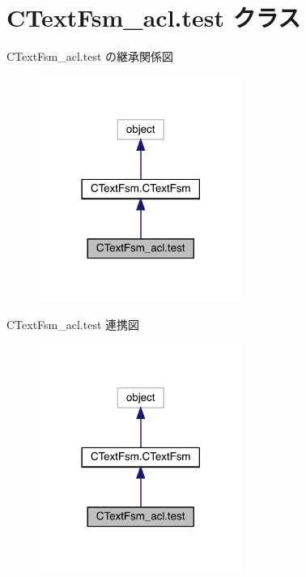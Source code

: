 \hypertarget{classCTextFsm__acl_1_1test}{}\section{C\+Text\+Fsm\+\_\+acl.\+test クラス}
\label{classCTextFsm__acl_1_1test}


C\+Text\+Fsm\+\_\+acl.\+test の継承関係図
\nopagebreak
\begin{figure}[H]
\begin{center}
\leavevmode
\includegraphics[width=189pt]{classCTextFsm__acl_1_1test__inherit__graph}
\end{center}
\end{figure}


C\+Text\+Fsm\+\_\+acl.\+test 連携図
\nopagebreak
\begin{figure}[H]
\begin{center}
\leavevmode
\includegraphics[width=189pt]{classCTextFsm__acl_1_1test__coll__graph}
\end{center}
\end{figure}
